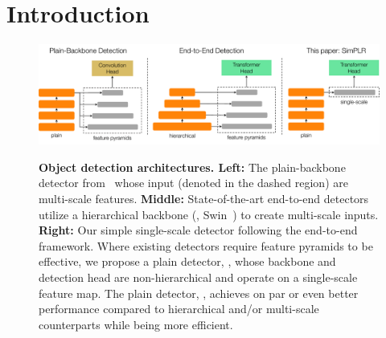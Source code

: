 
\section{Introduction}
\label{sec:introduction}


\begin{figure}[t]
    \centering
    \includegraphics[width=\linewidth]{fig/compare1.pdf}\\
    \caption{
    \textbf{Object detection architectures. Left:} The plain-backbone detector from~\cite{li2022vitdet} whose input (denoted in the dashed region) are multi-scale features. \textbf{Middle:} State-of-the-art end-to-end detectors~\cite{nguyen2022boxer,cheng2022mask2former} utilize a hierarchical backbone (\ie, Swin~\cite{liu2021swintransformer}) to create multi-scale inputs. \textbf{Right:} Our simple single-scale detector following the end-to-end framework. Where existing detectors require feature pyramids to be effective, we propose a plain detector, \ours, whose backbone and detection head are non-hierarchical and operate on a single-scale feature map. The plain detector, \ours, achieves on par or even better performance compared to hierarchical and/or multi-scale counterparts while being more efficient.
    }\label{fig:compare}
\end{figure}


